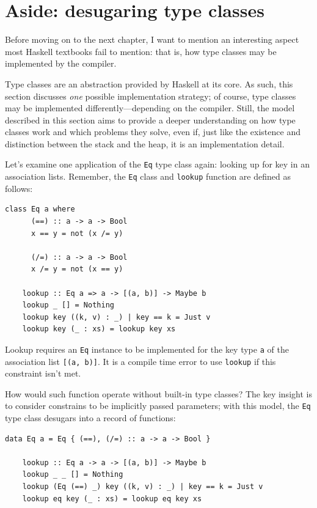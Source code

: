 \documentclass[UdineBachThesis,american,11pt]{PhdThesis}
\begin{document}
  \section{Aside: desugaring type classes}

  Before moving on to the next chapter, I want to mention an interesting aspect
  most Haskell textbooks fail to mention: that is, how type classes may be
  implemented by the compiler.

  Type classes are an abstraction provided by Haskell at its core. As such, this
  section discusses \emph{one} possible implementation strategy; of course, type
  classes may be implemented differently---depending on the compiler. Still, the
  model described in this section aims to provide a deeper understanding on how
  type classes work and which problems they solve, even if, just like the
  existence and distinction between the stack and the heap, it is an
  implementation detail.

  Let's examine one application of the \mbox{\texttt{Eq}} type class again:
  looking up for key in an association lists. Remember, the \mbox{\texttt{Eq}}
  class and \mbox{\texttt{lookup}} function are defined as follows:

  \begin{Verbatim}[gobble=4,fontsize=\small]
    class Eq a where
      (==) :: a -> a -> Bool
      x == y = not (x /= y)

      (/=) :: a -> a -> Bool
      x /= y = not (x == y)

    lookup :: Eq a => a -> [(a, b)] -> Maybe b
    lookup _ [] = Nothing
    lookup key ((k, v) : _) | key == k = Just v
    lookup key (_ : xs) = lookup key xs
  \end{Verbatim}

  Lookup requires an \mbox{\texttt{Eq}} instance to be implemented for the key
  type \texttt{a} of the association list \mbox{\texttt{[(a, b)]}}. It is a
  compile time error to use \mbox{\texttt{lookup}} if this constraint isn't met.

  How would such function operate without built-in type classes? The key insight
  is to consider constrains to be implicitly passed parameters; with this model,
  the \mbox{\texttt{Eq}} type class desugars into a record of functions:

  \begin{Verbatim}[gobble=4,fontsize=\small]
    data Eq a = Eq { (==), (/=) :: a -> a -> Bool }

    lookup :: Eq a -> a -> [(a, b)] -> Maybe b
    lookup _ _ [] = Nothing
    lookup (Eq (==) _) key ((k, v) : _) | key == k = Just v
    lookup eq key (_ : xs) = lookup eq key xs
  \end{Verbatim}
\end{document}
